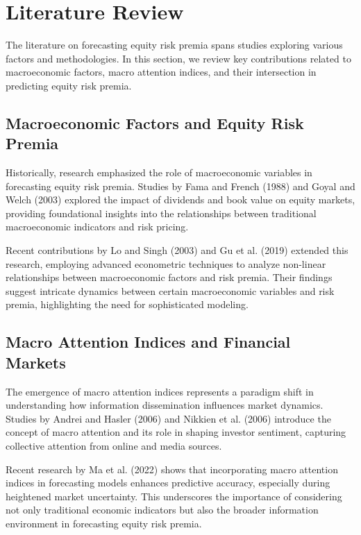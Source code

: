 \documentclass{article}
\begin{document}
\section{Literature Review}

The literature on forecasting equity risk premia spans studies exploring various factors and methodologies. In this section, we review key contributions related to macroeconomic factors, macro attention indices, and their intersection in predicting equity risk premia.

\subsection{Macroeconomic Factors and Equity Risk Premia}

Historically, research emphasized the role of macroeconomic variables in forecasting equity risk premia. Studies by Fama and French (1988) and Goyal and Welch (2003) explored the impact of dividends and book value on equity markets, providing foundational insights into the relationships between traditional macroeconomic indicators and risk pricing.

Recent contributions by Lo and Singh (2003) and Gu et al. (2019) extended this research, employing advanced econometric techniques to analyze non-linear relationships between macroeconomic factors and risk premia. Their findings suggest intricate dynamics between certain macroeconomic variables and risk premia, highlighting the need for sophisticated modeling.

\subsection{Macro Attention Indices and Financial Markets}

The emergence of macro attention indices represents a paradigm shift in understanding how information dissemination influences market dynamics. Studies by Andrei and Hasler (2006) and Nikkien et al. (2006) introduce the concept of macro attention and its role in shaping investor sentiment, capturing collective attention from online and media sources.

Recent research by Ma et al. (2022) shows that incorporating macro attention indices in forecasting models enhances predictive accuracy, especially during heightened market uncertainty. This underscores the importance of considering not only traditional economic indicators but also the broader information environment in forecasting equity risk premia.
\end{document}
